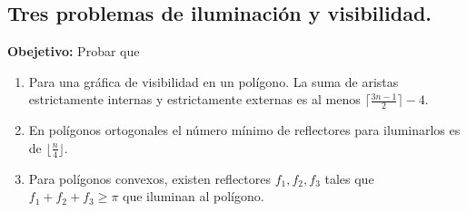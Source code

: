 \subsection[Expositor: Ares Gael Castro Romero.]{Tres problemas de iluminación y visibilidad.}
\textbf{Obejetivo:} Probar que
\begin{enumerate}
\item Para una gráfica de visibilidad en un polígono. La suma de aristas estrictamente internas
  y estrictamente externas es al menos $\lceil \frac{3n - 1}{2} \rceil - 4$.
\item En polígonos ortogonales el número mínimo de reflectores para iluminarlos es de $\lfloor \frac{n}{4} \rfloor$.
\item Para polígonos convexos, existen reflectores  $f_1, f_2, f_3$ tales que $f_1 + f_2 + f_3 \geq \pi$ que iluminan
  al polígono.
\end{enumerate}

